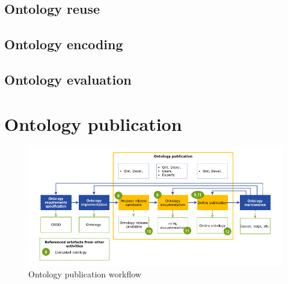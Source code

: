 \subsection{Ontology reuse}

\subsection{Ontology encoding}

\subsection{Ontology evaluation}

\newpage
\section{Ontology publication}
\begin{figure}[H]
    \centering
    \includegraphics[width=0.9\linewidth]{Figures/fig_25.png}
    \caption{Ontology publication workflow}
    \label{fig:enter-label}
\end{figure}
